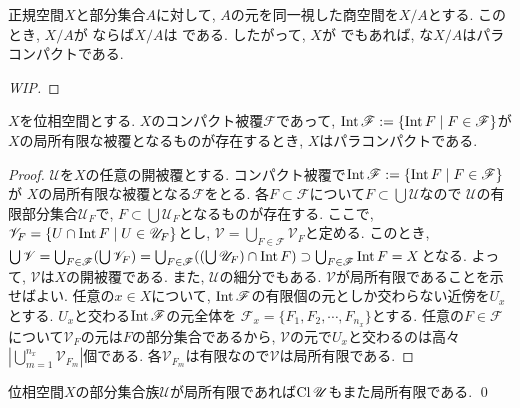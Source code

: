 \documentclass[uplatex, dvipdfmx, a4paper, 12pt, class=jsbook, crop=false]{standalone}
\begin{document}
\begin{proposition}
	正規空間$ X $と部分集合$ A $に対して, $ A $の元を同一視した商空間を$ X / A $とする. 
	このとき, $ X / A $が  ならば$ X / A $は  である. 
	したがって, $ X $が \Lindelof でもあれば, な$ X / A $はパラコンパクトである.
\end{proposition}
\begin{proof}
	[WIP]
\end{proof}

\begin{proposition}
	\label{prop:existence of a compact covering whose interior is a locally finite covering>ParaCpt}
	$ X $を位相空間とする. $ X $のコンパクト被覆$\mathscr{F}$であって, 
	$\topint \mathscr{F} \defeq \setcomp{\topint F}{F \in \mathscr{F}}$が$X$の局所有限な被覆となるものが存在するとき, 
	$ X $はパラコンパクトである.
\end{proposition}

\begin{proof}
	$ \mathscr{U} $を$ X $の任意の開被覆とする. 
	コンパクト被覆で$\topint\mathscr{F} \defeq \setcomp{\topint F}{F \in \mathscr{F}}$が
	$ X $の局所有限な被覆となる$ \mathscr{F} $をとる. 
	各$ F \subset \mathscr{F} $について$ F \subset \bigcup \mathscr{U} $なので
	$ \mathscr{U} $の有限部分集合$ \mathscr{U}_F  $で, $ F \subset \bigcup \mathscr{U}_F $となるものが存在する.
	ここで, $ \mathscr{V}_F = \setcomp{U \cap \topint F}{U \in \mathscr{U}_F}$とし, 
	$ \mathscr{V} = \bigcup_{F \in \mathscr{F}} \mathscr{V}_F $と定める. 
	このとき, $ \bigcup \mathscr{V}=\bigcup_{F\in\mathscr{F}}(\bigcup \mathscr{V}_F) 
	= \bigcup_{F\in \mathscr{F}}((\bigcup \mathscr{U}_F) \cap \mathop{\mathrm{Int}}\nolimits F) \supset \bigcup_{F\in\mathscr{F}}\mathop{\mathrm{Int}}\nolimits F = X $となる.
	よって, $ \mathscr{V} $は$ X $の開被覆である.
	また, $ \mathscr{U} $の細分でもある. $ \mathscr{V} $が局所有限であることを示せばよい. 
	任意の$ x \in X $について, $ \mathop{\mathrm{Int}}\nolimits \mathscr{F} $の有限個の元としか交わらない近傍を$U_x$とする. 
	$ U_x $と交わる$ \mathop{\mathrm{Int}}\nolimits \mathscr{F} $の元全体を
	$ \mathscr{F}_x = \{F_{1}, F_{2} ,\cdots, F_{n_x}\} $とする. 
	任意の$ F \in \mathscr{F} $について$ \mathscr{V}_F $の元は$ F $の部分集合であるから, 
	$ \mathscr{V} $の元で$ U_x $と交わるのは高々$ |\bigcup_{m=1}^{n_x} \mathscr{V}_{F_m}| $個である.
	各$ \mathscr{V}_{F_m} $は有限なので$ \mathscr{V} $は局所有限である.
\end{proof}

\begin{lemma}
	\label{lem:every closure of any locally finite family of subsets is locally finite}
	位相空間$ X $の部分集合族$ \mathscr{U} $が局所有限であれば$ \mathop{\mathrm{Cl}}\nolimits \mathscr{U} $もまた局所有限である. \qed
\end{lemma}
\end{document}
